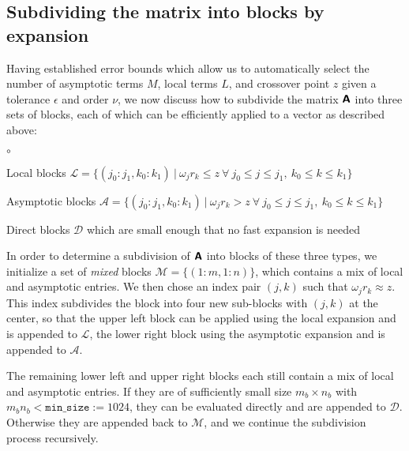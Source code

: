
\subsection{Subdividing the matrix into blocks by expansion}

Having established error bounds which allow us to automatically select the
number of asymptotic terms $M$, local terms $L$, and crossover point $z$ given a
tolerance $\epsilon$ and order $\nu$, we now discuss how to subdivide the matrix
$\bm{\mathsf{A}}$ into three sets of blocks, each of which can be efficiently applied to
a vector as described above:
\begin{list}{$\circ$}{}
    \item Local blocks $\mathscr{L} = \big\{ (j_0:j_1, k_0:k_1) \ | \ \omega_j
    r_k \leq z \ \forall \ j_0 \leq j \leq j_1, \ k_0 \leq k \leq k_1 \big\}$
    \item Asymptotic blocks $\mathscr{A} = \big\{ (j_0:j_1, k_0:k_1) \ | \
    \omega_j r_k > z \ \forall \ j_0 \leq j \leq j_1, \ k_0 \leq k \leq k_1
    \big\}$
    \item Direct blocks $\mathscr{D}$ which are small enough that no fast
    expansion is needed
\end{list}

In order to determine a subdivision of $\bm{\mathsf{A}}$ into blocks of these three
types, we initialize a set of \textit{mixed} blocks $\mathscr{M} = \{(1:m,
1:n)\}$, which contains a mix of local and asymptotic entries. We then chose an
index pair $(j,k)$ such that $\omega_j r_k \approx z$. This index subdivides the
block into four new sub-blocks with $(j,k)$ at the center, so that the upper
left block can be applied using the local expansion and is appended to
$\mathscr{L}$, the lower right block using the asymptotic expansion and is
appended to $\mathscr{A}$. 

The remaining lower left and upper right blocks each still contain a mix of
local and asymptotic entries. If they are of sufficiently small size $m_b \times
n_b$ with $m_b n_b < \texttt{min\_size} := 1024$, they can be evaluated directly
and are appended to $\mathscr{D}$. Otherwise they are appended back to
$\mathscr{M}$, and we continue the subdivision process recursively. 

